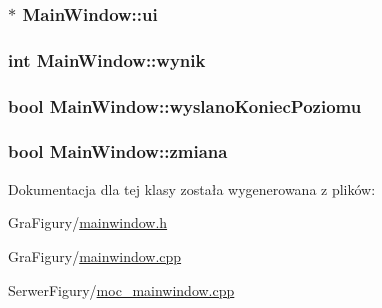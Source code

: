 \hypertarget{classMainWindow_a43606649aeaf9e561328935fca0cd1bf}{
\subsubsection[{ui}]{ $\ast$ Main\-Window\-::ui\hspace{0.3cm}{\ttfamily [private]}}}\label{classMainWindow_a43606649aeaf9e561328935fca0cd1bf}
\hypertarget{classMainWindow_a2b0740aaca0b5b566008e55916d4d0e9}{
\subsubsection[{wynik}]{\setlength{\rightskip}{0pt plus 5cm}int Main\-Window\-::wynik\hspace{0.3cm}{\ttfamily [private]}}}\label{classMainWindow_a2b0740aaca0b5b566008e55916d4d0e9}
\hypertarget{classMainWindow_a071cbb3e764cd5a0d37033a5eb82b1e0}{
\subsubsection[{wyslano\-Koniec\-Poziomu}]{\setlength{\rightskip}{0pt plus 5cm}bool Main\-Window\-::wyslano\-Koniec\-Poziomu\hspace{0.3cm}{\ttfamily [private]}}}\label{classMainWindow_a071cbb3e764cd5a0d37033a5eb82b1e0}
\hypertarget{classMainWindow_a331bf910d34ef19115989bba99c16b7b}{
\subsubsection[{zmiana}]{\setlength{\rightskip}{0pt plus 5cm}bool Main\-Window\-::zmiana\hspace{0.3cm}{\ttfamily [private]}}}\label{classMainWindow_a331bf910d34ef19115989bba99c16b7b}


Dokumentacja dla tej klasy została wygenerowana z plików\-:\begin{DoxyCompactItemize}
\item 
Gra\-Figury/\hyperlink{GraFigury_2mainwindow_8h}{mainwindow.\-h}\item 
Gra\-Figury/\hyperlink{GraFigury_2mainwindow_8cpp}{mainwindow.\-cpp}\item 
Serwer\-Figury/\hyperlink{SerwerFigury_2moc__mainwindow_8cpp}{moc\-\_\-mainwindow.\-cpp}\end{DoxyCompactItemize}
